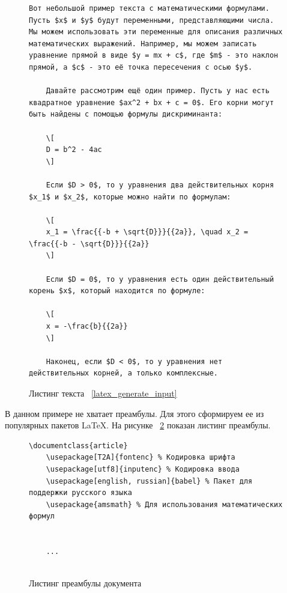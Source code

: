 \begin{figure}
    \begin{lstlisting}[language={[LaTeX]Tex}]
    Вот небольшой пример текста с математическими формулами. Пусть $x$ и $y$ будут переменными, представляющими числа. Мы можем использовать эти переменные для описания различных математических выражений. Например, мы можем записать уравнение прямой в виде $y = mx + c$, где $m$ - это наклон прямой, а $c$ - это её точка пересечения с осью $y$.
            
    Давайте рассмотрим ещё один пример. Пусть у нас есть квадратное уравнение $ax^2 + bx + c = 0$. Его корни могут быть найдены с помощью формулы дискриминанта:
        
    \[
    D = b^2 - 4ac
    \]
        
    Если $D > 0$, то у уравнения два действительных корня $x_1$ и $x_2$, которые можно найти по формулам:
        
    \[
    x_1 = \frac{{-b + \sqrt{D}}}{{2a}}, \quad x_2 = \frac{{-b - \sqrt{D}}}{{2a}}
    \]
        
    Если $D = 0$, то у уравнения есть один действительный корень $x$, который находится по формуле:
        
    \[
    x = -\frac{b}{{2a}}
    \]
        
    Наконец, если $D < 0$, то у уравнения нет действительных корней, а только комплексные.
    \end{lstlisting}
    \caption{Листинг текста ~\ref{latex_generate_input}}
    \label{latex_code}
\end{figure}

В данном примере не хватает преамбулы. Для этого сформируем ее из популярных пакетов \LaTeX. На рисунке ~\ref{preambula} показан листинг преамбулы.

\begin{figure}
    \begin{lstlisting}[language={[LaTeX]Tex}]
    \documentclass{article}
    \usepackage[T2A]{fontenc} % Кодировка шрифта
    \usepackage[utf8]{inputenc} % Кодировка ввода
    \usepackage[english, russian]{babel} % Пакет для поддержки русского языка
    \usepackage{amsmath} % Для использования математических формул
    
    
    ...
    
    \end{lstlisting}
    \caption{Листинг преамбулы документа}
    \label{preambula}
\end{figure}
